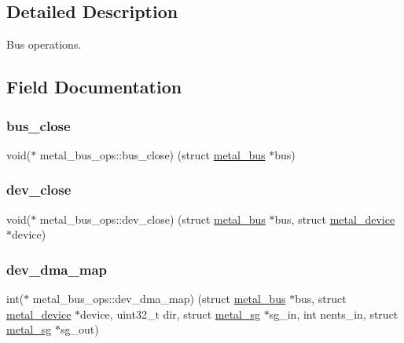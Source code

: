 \subsection{Detailed Description}
Bus operations. 

\subsection{Field Documentation}
\mbox{\label{structmetal__bus__ops_a004a5aa3614bc3755a926f1b11d1ceed}} 
\subsubsection{\texorpdfstring{bus\+\_\+close}{bus\_close}}
{\footnotesize\ttfamily void($\ast$ metal\+\_\+bus\+\_\+ops\+::bus\+\_\+close) (struct \hyperlink{structmetal__bus}{metal\+\_\+bus} $\ast$bus)}

\mbox{\label{structmetal__bus__ops_adb17fa0506b8a5c07addcf5ace6040be}} 
\subsubsection{\texorpdfstring{dev\+\_\+close}{dev\_close}}
{\footnotesize\ttfamily void($\ast$ metal\+\_\+bus\+\_\+ops\+::dev\+\_\+close) (struct \hyperlink{structmetal__bus}{metal\+\_\+bus} $\ast$bus, struct \hyperlink{structmetal__device}{metal\+\_\+device} $\ast$device)}

\mbox{\label{structmetal__bus__ops_afb63c10766ec71852d057d451d2d4432}} 
\subsubsection{\texorpdfstring{dev\+\_\+dma\+\_\+map}{dev\_dma\_map}}
{\footnotesize\ttfamily int($\ast$ metal\+\_\+bus\+\_\+ops\+::dev\+\_\+dma\+\_\+map) (struct \hyperlink{structmetal__bus}{metal\+\_\+bus} $\ast$bus, struct \hyperlink{structmetal__device}{metal\+\_\+device} $\ast$device, uint32\+\_\+t dir, struct \hyperlink{structmetal__sg}{metal\+\_\+sg} $\ast$sg\+\_\+in, int nents\+\_\+in, struct \hyperlink{structmetal__sg}{metal\+\_\+sg} $\ast$sg\+\_\+out)}


